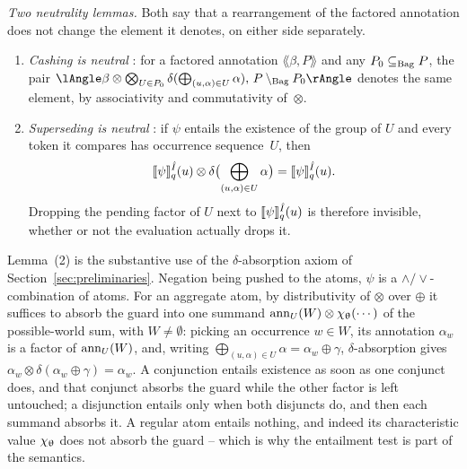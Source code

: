 \begin{appendixproof}
\smallskip\noindent\emph{Two neutrality lemmas.} Both say that a
rearrangement of the factored annotation does not change the element it
denotes, on either side separately.
\begin{enumerate}[(1)]
\item \emph{Cashing is neutral} :
  for a factored annotation $\lAngle\beta,P\rAngle$ and any
  $P_0\subseteq_{\mathrm{Bag}} P$, the pair
  $\lAngle\beta\otimes\bigotimes_{U\in P_0}\delta(\bigoplus_{(u,\alpha)\in
  U}\alpha),\,P\msetminus P_0\rAngle$ denotes the same element, by
  associativity and commutativity of~$\otimes$.
\item \emph{Superseding is neutral}
  : if $\psi$ entails the
  existence of the group of $U$ and every token it compares has
  occurrence sequence~$U$, then
  \[
    \llbracket \psi\rrbracket^{\hat I}_{q}(u)\otimes
      \delta\bigl(\bigoplus_{(u,\alpha)\in U}\alpha\bigr)
    =\llbracket \psi\rrbracket^{\hat I}_{q}(u).
  \]
  Dropping the pending factor of $U$ next to $\llbracket \psi\rrbracket^{\hat
  I}_{q}(u)$ is therefore invisible, whether or not the evaluation
  actually drops it.
\end{enumerate}
Lemma~(2) is the substantive use of the $\delta$-absorption axiom of
Section~\ref{sec:preliminaries}. Negation being pushed to the atoms,
$\psi$ is a $\land/\lor$-combination of atoms. For an aggregate atom, by
distributivity of $\otimes$ over $\oplus$ it suffices to absorb the guard
into one summand $\mathrm{ann}_U(W)\otimes\chi_{\mathrel{\uptheta}}(\cdots)$ of the
possible-world sum, with $W\neq\emptyset$: picking an occurrence $w\in W$,
its annotation $\alpha_w$ is a factor of $\mathrm{ann}_U(W)$, and, writing
$\bigoplus_{(u,\alpha)\in U}\alpha=\alpha_w\oplus\gamma$, $\delta$-absorption gives
$\alpha_w\otimes\delta(\alpha_w\oplus\gamma)=\alpha_w$. A conjunction
entails existence as soon as one conjunct does, and that conjunct absorbs
the guard while the other factor is left untouched; a disjunction entails
only when both disjuncts do, and then each summand absorbs it. A regular
atom entails nothing, and indeed its characteristic value $\chi_{\mathrel{\uptheta}}$
does not absorb the guard -- which is why the entailment test is part of
the semantics.


\end{appendixproof}
